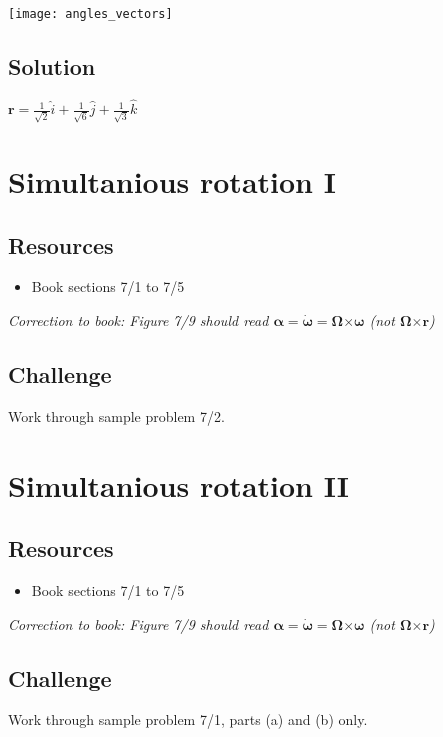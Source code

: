 \texttt{[image: angles\_vectors]}

\subsection*{Solution}
$\bm{r} = \frac{1}{\sqrt{2}} \hat{i} + \frac{1}{\sqrt{6}} \hat{j} + \frac{1}{\sqrt{3}} \hat{k}$


\newpage
\section{Simultanious rotation I}

\subsection*{Resources}
\begin{itemize}
    \item Book sections 7/1 to 7/5
\end{itemize}

\emph{Correction to book: Figure 7/9 should read $\bm{\alpha} = \bm{\dot{\omega}} = \bm{\Omega} \bm{\times} \bm{\omega}$ (not $\bm{\Omega} \bm{\times} \bm{r}$)}

\subsection*{Challenge}
Work through sample problem 7/2.




\newpage
\section{Simultanious rotation II}

\subsection*{Resources}
\begin{itemize}
    \item Book sections 7/1 to 7/5
\end{itemize}

\emph{Correction to book: Figure 7/9 should read $\bm{\alpha} = \bm{\dot{\omega}} = \bm{\Omega} \bm{\times} \bm{\omega}$ (not $\bm{\Omega} \bm{\times} \bm{r}$)}

\subsection*{Challenge}
Work through sample problem 7/1, parts (a) and (b) only.




